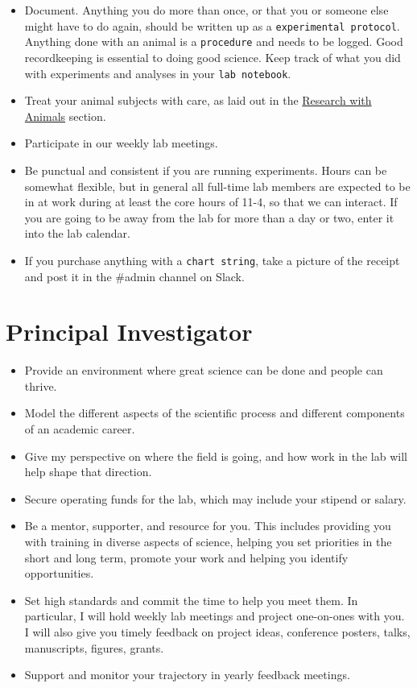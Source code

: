 \documentclass{tufte-book}
\newcommand{\doccls}[1]{\texttt{#1}}%
\begin{document}
\begin{itemize}
\item{Document. Anything you do more than once, or that you or someone
  else might have to do again, should be written up as a
  \doccls{experimental protocol}. Anything done with an animal is a
  \doccls{procedure} and needs to be logged. Good recordkeeping is
  essential to doing good science. Keep track of what you did with
  experiments and analyses in your \doccls{lab notebook}.}
\item{Treat your animal subjects with care, as laid out in the
  \href{ch:animals}{Research with Animals} section.}
\item{Participate in our weekly lab meetings.}
\item{Be punctual and consistent if you are running experiments. Hours
  can be somewhat flexible, but in general all full-time lab members
  are expected to be in at work during at least the core hours of
  11-4, so that we can interact. If you are going to be away from the
  lab for more than a day or two, enter it into the lab calendar.}
\item{If you purchase anything with a \doccls{chart string}, take a picture of the receipt
  and post it in the \#admin channel on Slack.}
\end{itemize}

\section{Principal Investigator}


\begin{itemize}
\item{Provide an environment where great science can be done and
  people can thrive.}
\item{Model the different aspects of the scientific process and
  different components of an academic career.}
\item{Give my perspective on
  where the field is going, and how work in the lab will help shape
  that direction.}
\item{Secure operating funds for the lab, which may include your
  stipend or salary.}
\item{Be a mentor, supporter, and resource for you. This includes
  providing you with training in diverse aspects of science, helping
  you set priorities in the short and long term, promote your work and
  helping you identify opportunities.}
\item{Set high standards and commit the time to help you meet them. In
  particular, I will hold weekly lab meetings and project one-on-ones
  with you. I will also give you timely feedback on project ideas,
  conference posters, talks, manuscripts, figures, grants.}
\item{Support and monitor your trajectory in yearly feedback
  meetings.}
\end{itemize}
\end{document}

